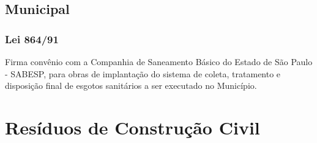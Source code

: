 \begin{subapend}
	\subsection{Municipal}
	\begin{subsubapend}
		\subsubsection{Lei 864/91}
		Firma convênio com a Companhia de Saneamento Básico do Estado de São Paulo - SABESP, para obras de implantação do sistema de coleta, tratamento e disposição final de esgotos sanitários a ser executado no Município.
	\end{subsubapend}
\end{subapend}



\section{Resíduos de Construção Civil}
